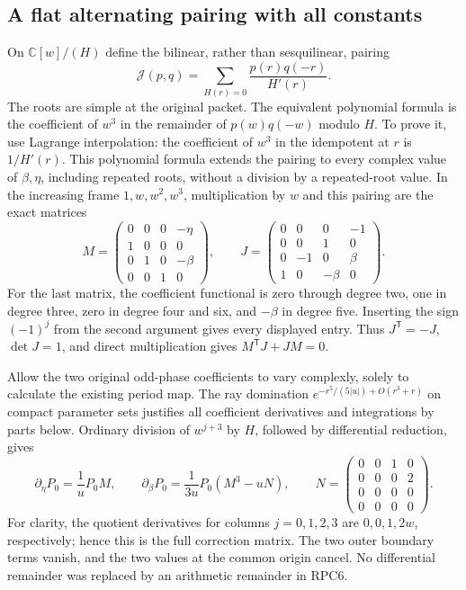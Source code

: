 \documentclass[11pt,a4paper]{article}
\begin{document}
\subsection{A flat alternating pairing with all constants}

On $\mathbb C[w]/(H)$ define the bilinear, rather than sesquilinear,
pairing
\[
 \mathcal J(p,q)=\sum_{H(r)=0}\frac{p(r)q(-r)}{H'(r)}.
 \tag{RPC4}
\]
The roots are simple at the original packet. The equivalent polynomial
formula is the coefficient of $w^3$ in the remainder of $p(w)q(-w)$
modulo $H$. To prove it, use Lagrange interpolation: the coefficient
of $w^3$ in the idempotent at $r$ is $1/H'(r)$. This polynomial
formula extends the pairing to every complex value of $\beta,\eta$,
including repeated roots, without a division by a repeated-root value.
In the increasing frame $1,w,w^2,w^3$, multiplication by $w$ and
this pairing are the exact matrices
\[
 M=\begin{pmatrix}0&0&0&-\eta\\1&0&0&0\\0&1&0&-\beta\\0&0&1&0\end{pmatrix},
 \qquad
 J=\begin{pmatrix}0&0&0&-1\\0&0&1&0\\0&-1&0&\beta\\1&0&-\beta&0\end{pmatrix}.
 \tag{RPC5}
\]
For the last matrix, the coefficient functional is zero through degree
two, one in degree three, zero in degree four and six, and $-\beta$
in degree five. Inserting the sign $(-1)^j$ from the second argument
gives every displayed entry. Thus $J^{\mathsf T}=-J$, $\det J=1$,
and direct multiplication gives $M^{\mathsf T}J+JM=0$.

Allow the two original odd-phase coefficients to vary complexly,
solely to calculate the existing period map. The ray domination
$e^{-r^5/(5|u|)+O(r^3+r)}$ on compact parameter sets justifies all
coefficient derivatives and integrations by parts below. Ordinary
division of $w^{j+3}$ by $H$, followed by differential reduction,
gives
\[
 \partial_\eta P_0=\frac1uP_0M,\qquad
 \partial_\beta P_0=\frac1{3u}P_0(M^3-uN),\qquad
 N=\begin{pmatrix}0&0&1&0\\0&0&0&2\\0&0&0&0\\0&0&0&0\end{pmatrix}.
 \tag{RPC6}
\]
For clarity, the quotient derivatives for columns $j=0,1,2,3$ are
$0,0,1,2w$, respectively; hence this is the full correction matrix.
The two outer boundary terms vanish, and the two values at the common
origin cancel. No differential remainder was replaced by an arithmetic
remainder in RPC6.
\end{document}
